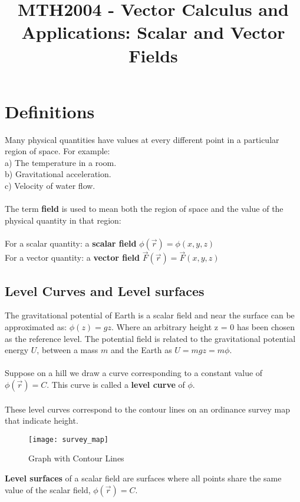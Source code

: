 \documentclass[11pt]{article}
\title{MTH2004 - Vector Calculus and Applications: Scalar and Vector Fields}
\begin{document}
    \maketitle
    \section{Definitions}\label{sec:definitions}
    Many physical quantities have values at every different point in a particular
    region of space.
    For example:\\
    \newline
    a) The temperature in a room.\\
    b) Gravitational acceleration.\\
    c) Velocity of water flow.
    \\
    \\
    The term \textbf{field} is used to mean both the region of space and the value of the physical
    quantity in that region:\\\\
    \textbullet \; For a scalar quantity: a \textbf{scalar field} $\phi(\vec{r}) = \phi(x,y,z)$\\
    \textbullet \; For a vector quantity: a \textbf{vector field} $\vec{F}(\vec{r}) = \vec{F}(x,y,z)$\\
    \subsection{Level Curves and Level surfaces}\label{subsec:level-curves-and-level-surfaces}
    The gravitational potential of Earth is a scalar field and near the surface can be approximated as: $\phi(z) = gz$.
    Where an arbitrary height z = 0 has been chosen as the reference level.
    The potential field is related to the gravitational potential energy $U$, between a mass $m$ and the Earth
    as $U = mgz = m\phi$.\\\\
    Suppose on a hill we draw a curve corresponding to a constant value of $\phi(\vec{r}) = C$.
    This curve is called a \textbf{level curve} of $\phi$.\\\\
    These level curves correspond to the contour lines on an ordinance survey map that indicate height.
    \begin{figure}
        \begin{center}
            \label{fig:figure}
            \texttt{[image: survey\_map]}
            \caption{Graph with Contour Lines}
        \end{center}
    \end{figure}
    \textbf{Level surfaces} of a scalar field are surfaces where all points share the same value of the scalar field,
    $\phi(\vec{r}) = C$.\\
\end{document}
